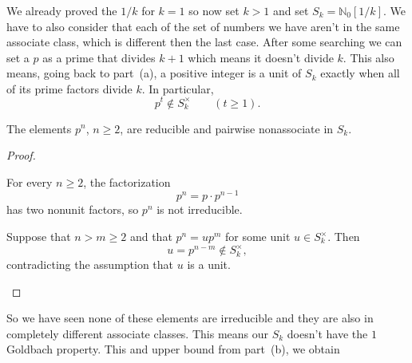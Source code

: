 \documentclass[11pt]{scrartcl}
\begin{document}
\begin{soln}
    \subsubsection*{}
	We already proved the $1/k$ for $k=1$ so now set $k>1$ and set  $S_k=\mathbb N_0[1/k]$.
    We have to also consider that each of the set of numbers we have
	aren't in the same associate class, which is different then the last case.
	After some searching we can set a $p$ as a prime that divides $k+1$ which means
	it doesn't divide $k$. This also means, going back to part~(a), 
	a positive integer is a
    unit of $S_k$ exactly when all of its prime factors divide $k$.
    In particular,
    \[
    p^t\notin S_k^\times
    \qquad(t\ge1).
    \]

    \begin{claim*}
        The elements $p^n$, $n\ge2$, are reducible and pairwise
        nonassociate in $S_k$.
    \end{claim*}

    \begin{proof}
        \begin{subproof}
            For every $n\ge2$, the factorization
            \[
            p^n=p\cdot p^{n-1}
            \]
            has two nonunit factors,
            so $p^n$ is not irreducible.
        \end{subproof}

        \begin{subproof}

            Suppose that $n>m\ge2$ and that $p^n=u p^m$
            for some unit $u\in S_k^\times$.
            Then
            \[
            u=p^{n-m}\notin S_k^\times,
            \]
            contradicting the assumption that $u$ is a unit.
        \end{subproof}
    \end{proof}

  
	So we have seen none of these elements are irreducible and they are also 
	in completely different associate classes. This means our $S_k$ doesn't 
	have the $1$ Goldbach property. This and upper bound from  part~(b), we obtain
\end{soln}
\end{document}
